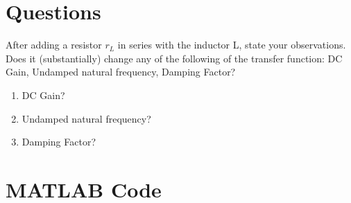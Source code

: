 \documentclass[a4paper,12pt]{article}
\newenvironment{QandA}
	{\begin{enumerate}[label=\arabic*.]\sl} %
  {\end{enumerate}}
\newenvironment{answered}{\par\normalfont}{} %
\begin{document}
	\section{Questions}
	After adding a resistor $r_{L}$ in series with the inductor L, state your observations. Does it (substantially) change any of the following of the transfer function: DC Gain, Undamped natural frequency, Damping Factor?
	
	
		\begin{QandA}
		
	\item DC Gain?
		\begin{answered}
				
		\end{answered}
		
	\item Undamped natural frequency?
	    \begin{answered}
	    
	    \end{answered}

    \item Damping Factor?
        \begin{answered}
        
        \end{answered}
	\end{QandA}	
	
	\section{MATLAB Code}
	
\end{document}

